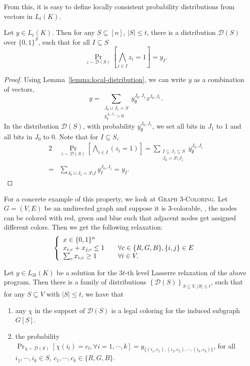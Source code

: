 \documentclass[a4paper,twoside,justified]{tufte-handout}
\begin{document}
From this, it is easy to define locally consistent probability distributions from vectors in $L_t(K)$.
\begin{theorem}
  Let $y \in L_t(K)$. Then for any $S \subseteq [n]$, $|S| \le t$, there is a distribution $\mathscr{D}(S)$ over
  $\{0,1\}^S$, such that for all $I \subseteq S$
  \[
  \Pr_{z \sim \mathscr{D}(S)}\left[ \bigwedge_{i \in I} z_i=1 \right] = y_I.
  \]
\end{theorem}
\begin{proof}
  Using Lemma~\ref{lemma:local-distribution}, we can write $y$ as a combination of vectors,
  \[
  y = \sum_{\substack{J_0 \cupdot J_1=S \\ y^{J_0,J_1}_{\emptyset}>0}} y^{J_0,J_1}_{\emptyset} z^{J_0,J_1}.
  \]
  In the distribution $\mathscr{D}(S)$, with probability $y^{J_0,J_1}_{\emptyset}$, we set all bits in $J_1$ to 1 and
  all bits in $J_0$ to 0. Note that for $I \subseteq S$,
  \begin{alignat*}{2}
    & \Pr_{z \sim \mathscr{D}(S)}\left[ \bigwedge_{i \in I} (z_i=1) \right] 
    = \sum_{\substack{I \subseteq J_1 \subseteq S \\ J_0=S \setminus J_1}} y^{J_0,J_1}_{\emptyset} \\
    =& \sum_{J_0 \cupdot J_1 = S \setminus I} y^{J_0,J_1}_{I} = y_I.
  \end{alignat*}
\end{proof}

For a concrete example of this property, we look at \textsc{Graph 3-Coloring}. Let $G=(V,E)$ be an undirected graph
and suppose it is 3-colorable, \ie, the nodes can be colored with red, green and blue such that adjacent
nodes get assigned different colors. Then we get the following relaxation:
\[
\left\{
\begin{array}{l l}
  x \in \{0,1\}^n \\
  x_{i,c}+x_{j,c} \le 1 & \quad \forall c \in \{R,G,B\}, \{i,j\} \in E \\
  \sum_{c} x_{i,c} \ge 1 & \quad \forall i \in V.
\end{array}
\right.
\]
\begin{lemma}
  Let $y \in L_{3t}(K)$ be a solution for the $3t$-th level Lasserre relaxation of the above program. 
  Then there is a family of distributions $\left\{ \mathscr{D}(S) \right\}_{S \subseteq V, |S| \le t}$, such that for any
  $S \subseteq V$ with $|S| \le t$, we have that
  \begin{enumerate}
    \item any $\chi$ in the support of $\mathscr{D}(S)$ is a legal coloring for the induced subgraph $G[S]$.
    \item the probability $\Pr_{\chi \sim \mathscr{D}(S)}[\chi(i_l)=c_l, \forall i=1,\cdots,k] = y_{\{(i_1,c_1),(i_2,c_2),\cdots,(i_k,c_k)\}}$,
      for all $i_1,\cdots,i_k \in S$, $c_1,\cdots,c_k \in \{R,G,B\}$.
  \end{enumerate}
\end{lemma}



\end{document}

